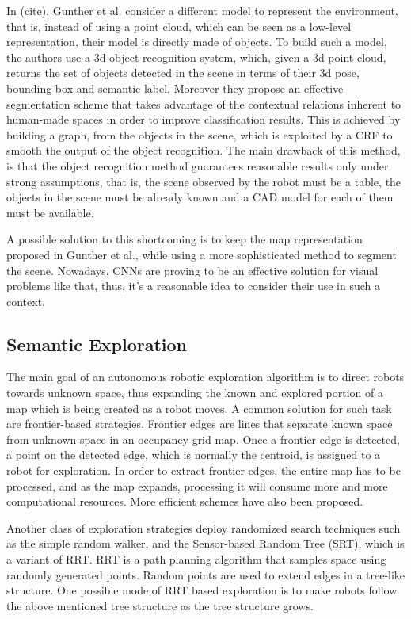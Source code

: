 \documentclass{article}
\begin{document}
	In (cite), Gunther et al. consider a different model to represent the environment, that is, instead of using a point cloud, which can be seen as a low-level representation, their model is directly made of objects. To build such a model, the authors use a 3d object recognition system, which, given a 3d point cloud, returns the set of objects detected in the scene in terms of their 3d pose, bounding box and semantic label. Moreover they propose an effective segmentation scheme that takes advantage of the contextual relations inherent to human-made spaces in order to improve classification results. This is achieved by building a graph, from the objects in the scene, which is exploited by a CRF to smooth the output of the object recognition. The main drawback of this method, is that the object recognition method guarantees reasonable results only under strong assumptions, that is, the scene observed by the robot must be a table, the objects in the scene must be already known and a CAD model for each of them must be available.
	
	A possible solution to this shortcoming is to keep the map representation proposed in Gunther et al., while using a more sophisticated method to segment the scene. Nowadays, CNNs are proving to be an effective solution for visual problems like that, thus, it's a reasonable idea to consider their use in such a context.
		
	\subsection*{Semantic Exploration}
	
	The main goal of an autonomous robotic exploration algorithm is to direct robots towards unknown space, thus expanding the known and explored portion of a map which is being created as a robot moves. A common solution for such task are frontier-based strategies. Frontier edges are lines that separate known space from unknown space in an occupancy grid map. Once a frontier edge is detected, a point on the detected edge, which is normally the centroid, is assigned to a robot for exploration. In order to extract frontier edges, the entire map has to be processed, and as the map expands, processing it will consume more and more computational resources. More efficient schemes have also been proposed.
	
	Another class of exploration strategies deploy randomized search techniques such as the simple random walker, and the Sensor-based Random Tree (SRT), which is a variant of RRT. RRT is a path planning algorithm that samples space using randomly generated points. Random points are used to extend edges in a tree-like structure. One possible mode of RRT based exploration is to make robots follow the above mentioned tree structure as the tree structure grows.
	
\end{document}
